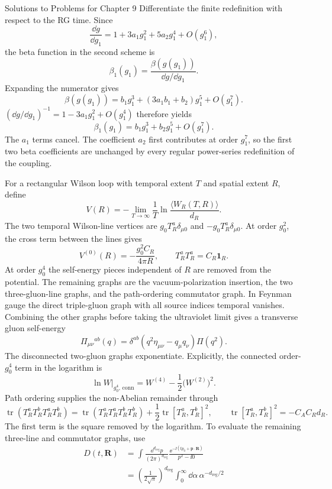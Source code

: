 \begin{bankssolutions}{Solutions to Problems for Chapter 9}
Differentiate the finite redefinition with respect to the RG time.  Since
\[
 \frac{\dd g}{\dd g_1}=1+3a_1g_1^2+5a_2g_1^4+O(g_1^6),
\]
the beta function in the second scheme is
\[
 \beta_1(g_1)=\frac{\beta(g(g_1))}{\dd g/\dd g_1}.
\]
Expanding the numerator gives
\[
 \beta(g(g_1))=b_1g_1^3+(3a_1b_1+b_2)g_1^5+O(g_1^7).
\]
$(\dd g/\dd g_1)^{-1}=1-3a_1g_1^2+O(g_1^4)$ therefore yields
\[
 \boxed{\beta_1(g_1)=b_1g_1^3+b_2g_1^5+O(g_1^7).}
\]
The $a_1$ terms cancel.  The coefficient $a_2$ first contributes at order
$g_1^7$, so the first two beta coefficients are unchanged by every regular
power-series redefinition of the coupling.

For a rectangular Wilson loop with temporal extent $T$ and spatial extent
$R$, define
\[
 V(R)=-\lim_{T\to\infty}\frac1T\ln
 \frac{\langle W_R(T,R)\rangle}{d_R}.
\]
The two temporal Wilson-line vertices are $g_0T_R^a\delta_{\mu0}$ and
$-g_0T_R^a\delta_{\mu0}$.  At order $g_0^2$, the cross term between the
lines gives
\[
 V^{(0)}(R)=-\frac{g_0^2C_R}{4\pi R},
 \qquad T_R^aT_R^a=C_R\mathbf1_R.
\]
At order $g_0^4$ the self-energy pieces independent of $R$ are removed from
the potential.  The remaining graphs are the vacuum-polarization insertion,
the two three-gluon-line graphs, and the path-ordering commutator graph.  In
Feynman gauge the direct triple-gluon graph with all source indices temporal
vanishes.  Combining the other graphs before taking the ultraviolet limit
gives a transverse gluon self-energy
\[
 \Pi_{\mu\nu}{}^{ab}(q)=\delta^{ab}(q^2\eta_{\mu\nu}-q_\mu q_\nu)
 \Pi(q^2).
\]
The disconnected two-gluon graphs exponentiate.  Explicitly, the connected
order-$g_0^4$ term in the logarithm is
\[
 \ln W\big|_{g_0^4,\,\mathrm{conn}}
 =W^{(4)}-\frac12\bigl(W^{(2)}\bigr)^2.
\]
Path ordering supplies the non-Abelian remainder through
\[
 \operatorname{tr}(T_R^aT_R^bT_R^aT_R^b)
 =\operatorname{tr}(T_R^aT_R^aT_R^bT_R^b)
 +\frac12\operatorname{tr}[T_R^a,T_R^b]^2,
 \qquad
 \operatorname{tr}[T_R^a,T_R^b]^2=-C_A C_Rd_R.
\]
The first term is the square removed by the logarithm.  To evaluate the
remaining three-line and commutator graphs, use
\begin{align*}
 D(t,\mathbf R)&=\int\frac{\dd^{d_{\mathrm{reg}}}p}{(2\pi)^{d_{\mathrm{reg}}}}
 \frac{\ee^{-\ii(tp_0+\mathbf p\cdot\mathbf R)}}{p^2-\ii0}\\
 &=\left(\frac{1}{2\sqrt\pi}\right)^{d_{\mathrm{reg}}}
 \int_0^\infty\dd\alpha\,\alpha^{-d_{\mathrm{reg}}/2}

\end{align*}
\end{bankssolutions}
